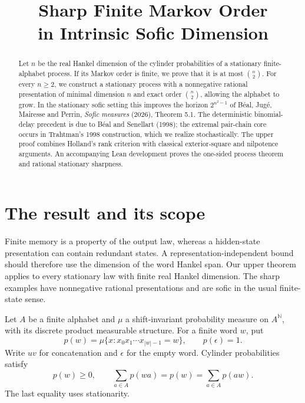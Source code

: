 
\newcommand{\sourcecredit}{Source: \href{https://github.com/egilburg/aimath}{github.com/egilburg/aimath}}
\title{Sharp Finite Markov Order\\in Intrinsic Sofic Dimension}

\maketitle

\begin{abstract}
Let \(n\) be the real Hankel dimension of the cylinder probabilities of a stationary finite-alphabet process. If its Markov order is finite, we prove that it is at most \(\binom n2\). For every \(n\ge2\), we construct a stationary process with a nonnegative rational presentation of minimal dimension \(n\) and exact order \(\binom n2\), allowing the alphabet to grow. In the stationary sofic setting this improves the horizon \(2^{n^2-1}\) of B\'eal, Jug\'e, Mairesse and Perrin, \emph{Sofic measures} (2026), Theorem 5.1. The deterministic binomial-delay precedent is due to B\'eal and Senellart (1998); the extremal pair-chain core occurs in Trahtman's 1998 construction, which we realize stochastically. The upper proof combines Holland's rank criterion with classical exterior-square and nilpotence arguments. An accompanying Lean development proves the one-sided process theorem and rational stationary sharpness.
\end{abstract}

\section{The result and its scope}
Finite memory is a property of the output law, whereas a hidden-state presentation can contain redundant states. A representation-independent bound should therefore use the dimension of the word Hankel span. Our upper theorem applies to every stationary law with finite real Hankel dimension. The sharp examples have nonnegative rational presentations and are sofic in the usual finite-state sense.

Let \(A\) be a finite alphabet and \(\mu\) a shift-invariant probability measure on \(A^{\mathbb N}\), with its discrete product measurable structure. For a finite word \(w\), put
\[
 p(w)=\mu\{x:x_0x_1\cdots x_{|w|-1}=w\},\qquad p(\epsilon)=1.
\]
Write \(uv\) for concatenation and \(\epsilon\) for the empty word. Cylinder probabilities satisfy
\begin{equation}\label{eq:consistency}
 p(w)\ge0,\qquad \sum_{a\in A}p(wa)=p(w)=\sum_{a\in A}p(aw).
\end{equation}
The last equality uses stationarity.

